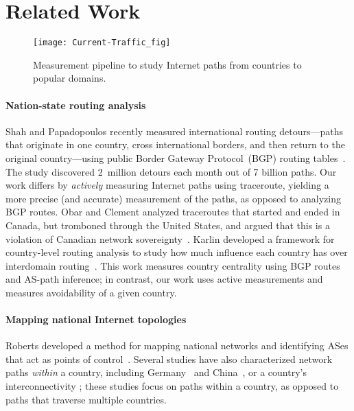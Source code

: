 \section{Related Work}
\label{related}

\begin{figure*}[t]
\centering
\texttt{[image: Current-Traffic\_fig]}
\caption{Measurement pipeline to study Internet paths from countries to
  popular domains.}
\label{fig:pipeline1}
\end{figure*}

\paragraph{Nation-state routing analysis}  Shah and
Papadopoulos recently measured international routing detours---paths that originate
in
one country, cross international borders, and then return to the
original country---using public Border Gateway Protocol~(BGP) routing tables~\cite
{shah2015characterizing}. 
The study discovered 2~million detours each month out
of 7 billion paths.
Our work differs by {\em actively}
measuring Internet paths using traceroute, yielding a more precise (and accurate) measurement of the paths, %
as opposed to analyzing BGP
routes.  Obar and Clement analyzed traceroutes
that started and ended in Canada, but tromboned through the United
States, and argued that
this is a violation of Canadian network
sovereignty~\cite{obar2012internet}. 
Karlin \ea{} developed a framework for country-level
routing analysis to study how much influence each country has over
interdomain routing~\cite{karlin2009nation}.  This work measures country
centrality using BGP routes and AS-path inference; in contrast, our work uses active 
measurements and measures avoidability of a given country. 

\paragraph{Mapping national Internet topologies}  Roberts \ea{} developed a method
for mapping national networks and identifying ASes that act as points of
control~\cite{roberts2011mapping}.   %
 Several studies have also characterized network paths {\em
within} a country, including
Germany~\cite{wahlisch2010framework,wahlisch2012exposing} and
China~\cite{zhou2007chinese}, or a country's interconnectivity %
\cite{bischof2015and,gupta2014peering,fanou2015diversity}; these studies
focus on paths within a country, as opposed to paths that traverse multiple countries.

